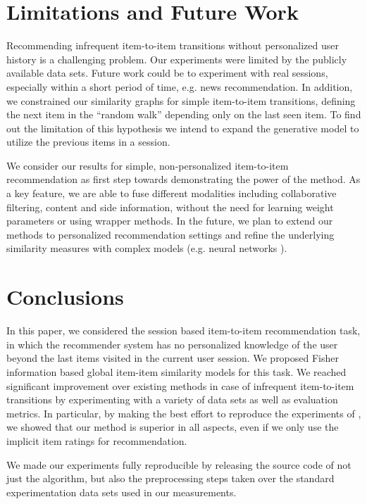 \section{Limitations and Future Work}

Recommending infrequent item-to-item transitions without personalized user history is a challenging problem. Our experiments were limited by the publicly available data sets. Future work could be to experiment with real sessions, especially within a short period of time, e.g. news recommendation. In addition, we constrained our similarity graphs for simple item-to-item transitions, defining the next item in the ``random walk'' depending only on the last seen item. To find out the limitation of this hypothesis we intend to expand the generative model to utilize the previous items in a session. 

We consider our results for simple, non-personalized item-to-item recommendation as first step towards demonstrating the power of the method. As a key feature, we are able to fuse different modalities including collaborative filtering, content and side information, without the need for learning weight parameters or using wrapper methods. In the future, we plan to extend our methods to personalized recommendation settings and refine the underlying similarity measures with complex models (e.g. neural networks \cite{deep_learning_recsys}). 

\section{Conclusions}

In this paper, we considered the session based item-to-item recommendation task, in which the recommender system has no personalized knowledge of the user beyond the last items visited in the current user session.
We proposed Fisher information based global item-item similarity models for this task.
We reached significant improvement over existing methods in case of infrequent item-to-item transitions by experimenting with a variety of data sets as well as evaluation metrics. In particular, by making the best effort to 
reproduce the experiments of \cite{koenigstein2013towards}, we showed that our method is superior in all aspects, even if we only use the implicit item ratings for recommendation.

We made our experiments fully reproducible by releasing the source code of not just the algorithm, but also the preprocessing steps taken over the standard 
experimentation data sets used in our measurements.

